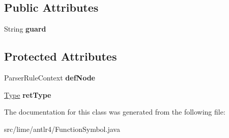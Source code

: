 \subsection*{Public Attributes}
\begin{DoxyCompactItemize}
\item 
\mbox{\label{classlime_1_1antlr4_1_1FunctionSymbol_a334b65f24867b2427b964335e6124ac7}} 
String {\bfseries guard}
\end{DoxyCompactItemize}
\subsection*{Protected Attributes}
\begin{DoxyCompactItemize}
\item 
\mbox{\label{classlime_1_1antlr4_1_1FunctionSymbol_a003110d5ef39cc723fdf4df07527be8f}} 
Parser\+Rule\+Context {\bfseries def\+Node}
\item 
\mbox{\label{classlime_1_1antlr4_1_1FunctionSymbol_a55b846a3df1a738ef1b49f1216dbc61d}} 
\hyperlink{interfacelime_1_1antlr4_1_1Type}{Type} {\bfseries ret\+Type}
\end{DoxyCompactItemize}


The documentation for this class was generated from the following file\+:\begin{DoxyCompactItemize}
\item 
src/lime/antlr4/Function\+Symbol.\+java\end{DoxyCompactItemize}
